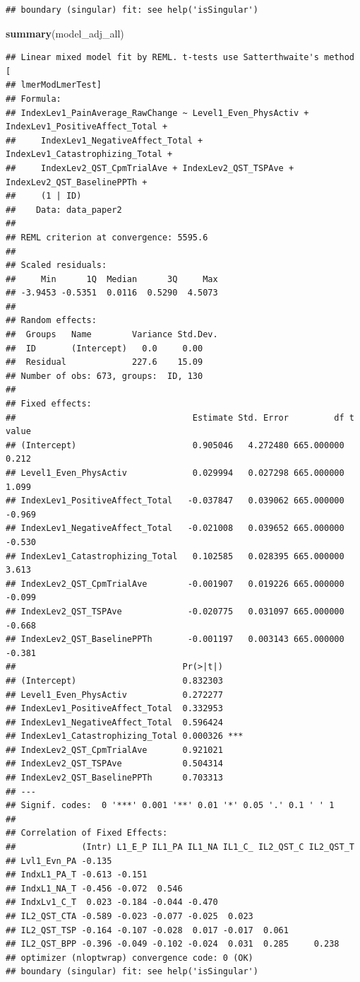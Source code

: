 \documentclass[
  12pt,
]{article}
\newenvironment{Shaded}{\begin{snugshade}}{\end{snugshade}}
\newcommand{\FunctionTok}[1]{\textcolor[rgb]{0.13,0.29,0.53}{\textbf{#1}}}
\newcommand{\NormalTok}[1]{#1}
\begin{document}
\begin{verbatim}
## boundary (singular) fit: see help('isSingular')
\end{verbatim}

\begin{Shaded}
\begin{Highlighting}[]
\FunctionTok{summary}\NormalTok{(model\_adj\_all)}
\end{Highlighting}
\end{Shaded}

\begin{verbatim}
## Linear mixed model fit by REML. t-tests use Satterthwaite's method [
## lmerModLmerTest]
## Formula: 
## IndexLev1_PainAverage_RawChange ~ Level1_Even_PhysActiv + IndexLev1_PositiveAffect_Total +  
##     IndexLev1_NegativeAffect_Total + IndexLev1_Catastrophizing_Total +  
##     IndexLev2_QST_CpmTrialAve + IndexLev2_QST_TSPAve + IndexLev2_QST_BaselinePPTh +  
##     (1 | ID)
##    Data: data_paper2
## 
## REML criterion at convergence: 5595.6
## 
## Scaled residuals: 
##     Min      1Q  Median      3Q     Max 
## -3.9453 -0.5351  0.0116  0.5290  4.5073 
## 
## Random effects:
##  Groups   Name        Variance Std.Dev.
##  ID       (Intercept)   0.0     0.00   
##  Residual             227.6    15.09   
## Number of obs: 673, groups:  ID, 130
## 
## Fixed effects:
##                                   Estimate Std. Error         df t value
## (Intercept)                       0.905046   4.272480 665.000000   0.212
## Level1_Even_PhysActiv             0.029994   0.027298 665.000000   1.099
## IndexLev1_PositiveAffect_Total   -0.037847   0.039062 665.000000  -0.969
## IndexLev1_NegativeAffect_Total   -0.021008   0.039652 665.000000  -0.530
## IndexLev1_Catastrophizing_Total   0.102585   0.028395 665.000000   3.613
## IndexLev2_QST_CpmTrialAve        -0.001907   0.019226 665.000000  -0.099
## IndexLev2_QST_TSPAve             -0.020775   0.031097 665.000000  -0.668
## IndexLev2_QST_BaselinePPTh       -0.001197   0.003143 665.000000  -0.381
##                                 Pr(>|t|)    
## (Intercept)                     0.832303    
## Level1_Even_PhysActiv           0.272277    
## IndexLev1_PositiveAffect_Total  0.332953    
## IndexLev1_NegativeAffect_Total  0.596424    
## IndexLev1_Catastrophizing_Total 0.000326 ***
## IndexLev2_QST_CpmTrialAve       0.921021    
## IndexLev2_QST_TSPAve            0.504314    
## IndexLev2_QST_BaselinePPTh      0.703313    
## ---
## Signif. codes:  0 '***' 0.001 '**' 0.01 '*' 0.05 '.' 0.1 ' ' 1
## 
## Correlation of Fixed Effects:
##             (Intr) L1_E_P IL1_PA IL1_NA IL1_C_ IL2_QST_C IL2_QST_T
## Lvl1_Evn_PA -0.135                                                
## IndxL1_PA_T -0.613 -0.151                                         
## IndxL1_NA_T -0.456 -0.072  0.546                                  
## IndxLv1_C_T  0.023 -0.184 -0.044 -0.470                           
## IL2_QST_CTA -0.589 -0.023 -0.077 -0.025  0.023                    
## IL2_QST_TSP -0.164 -0.107 -0.028  0.017 -0.017  0.061             
## IL2_QST_BPP -0.396 -0.049 -0.102 -0.024  0.031  0.285     0.238   
## optimizer (nloptwrap) convergence code: 0 (OK)
## boundary (singular) fit: see help('isSingular')
\end{verbatim}
\end{document}
